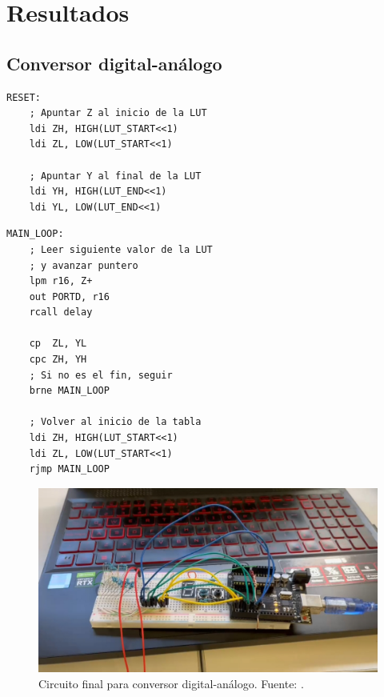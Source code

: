 \section{Resultados}
\subsection{Conversor digital-análogo}

\begin{verbatim}
RESET:
    ; Apuntar Z al inicio de la LUT
    ldi ZH, HIGH(LUT_START<<1)
    ldi ZL, LOW(LUT_START<<1)

	; Apuntar Y al final de la LUT
	ldi YH, HIGH(LUT_END<<1)
	ldi YL, LOW(LUT_END<<1)
\end{verbatim}

\begin{verbatim}
MAIN_LOOP:
    ; Leer siguiente valor de la LUT
    ; y avanzar puntero
    lpm r16, Z+
    out PORTD, r16
    rcall delay

    cp  ZL, YL
    cpc ZH, YH
    ; Si no es el fin, seguir
    brne MAIN_LOOP

    ; Volver al inicio de la tabla
    ldi ZH, HIGH(LUT_START<<1)
    ldi ZL, LOW(LUT_START<<1)
    rjmp MAIN_LOOP
\end{verbatim}

\begin{figure}[H]
  \centering
  \includegraphics[width=\linewidth]{./Anexos/Resultados/DAC/Circuito.jpg}
  \caption{Circuito final para conversor digital-análogo. Fuente: \cite{LabDrive}.}
  \label{fig:conversor_circuito}
\end{figure}

